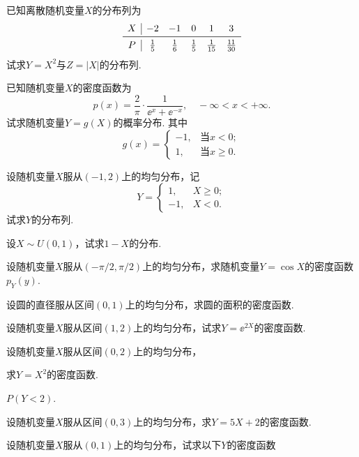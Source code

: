 \begin{xiti}
  \item 已知离散随机变量$X$的分布列为
  \[
    \begin{array}{c|ccccc}
      X & -2 & -1 & 0 & 1 & 3 \\
      \midrule
      P & \frac15 & \frac16 & \frac15 & \frac1{15} & \frac{11}{30}
    \end{array}
  \]
  试求$Y=X^2$与$Z=|X|$的分布列.

  \item 已知随机变量$X$的密度函数为
  \[
    p(x) = \frac2\pi\cdot \frac1{\ee^x+\ee^{-x}},\quad -\infty < x < +\infty.
  \]
  试求随机变量$Y=g(X)$的概率分布. 其中
  \[
    g(x) = \begin{cases}
      -1, & \text{当$x<0$};\\
      1, & \text{当$x\ge0$}.
    \end{cases}
  \]

  \item 设随机变量$X$服从$(-1,2)$上的均匀分布，记
  \[
    Y = \begin{cases}
      1, & X \ge 0; \\
      -1, & X < 0.
    \end{cases}
  \]
  试求$Y$的分布列.

  \item 设$X\sim U(0,1)$，试求$1-X$的分布.

  \item 设随机变量$X$服从$(-\pi/2,\pi/2)$上的均匀分布，求随机变量$Y=\cos X$的密度函数$p_Y(y)$.

  \item 设圆的直径服从区间$(0,1)$上的均匀分布，求圆的面积的密度函数.

  \item 设随机变量$X$服从区间$(1,2)$上的均匀分布，试求$Y=\ee^{2X}$的密度函数.

  \item 设随机变量$X$服从区间$(0,2)$上的均匀分布，\begin{inparaenum}[(1)]
        \item 求$Y=X^2$的密度函数.
        \item $P(Y<2)$.
      \end{inparaenum}

  \item 设随机变量$X$服从区间$(0,3)$上的均匀分布，求$Y=5X+2$的密度函数.

  \item 设随机变量$X$服从$(0,1)$上的均匀分布，试求以下$Y$的密度函数


\end{xiti}
